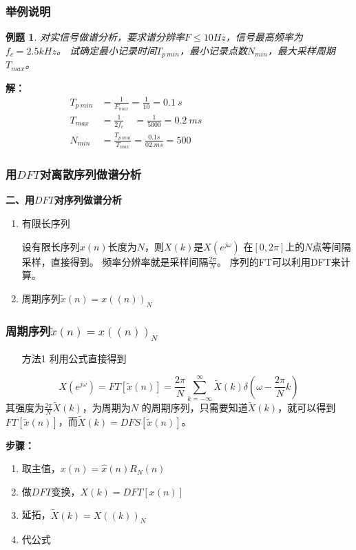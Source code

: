 \documentclass[notheorems,compress,mathserif,table]{beamer}
\newtheorem{example}{例题}
\begin{document}
\begin{frame}[shrink]\frametitle{举例说明}%
\begin{example}
对实信号做谱分析，要求谱分辨率$F\leq10Hz$，信号最高频率为$f_c = 2.5kHz$。
试确定最小记录时间$T_{p\: min}$，最小记录点数$N_{min}$，最大采样周期$T_{max}$。	
\end{example}
%
%
\textbf{解：}
\begin{equation*}
\begin{split}
    T_{p\:min} &= \frac{1}{F_{max}}   =  \frac{1}{10} =0.1\:s \quad\qquad\qquad\qquad\qquad\qquad   \\
    T_{max}    &= \frac{1}{2f_c} \quad     =  \frac{1}{5000} =0.2\:ms               \\
    N_{min}    &= \frac{T_{p\: min}}{T_{max}}  = \frac{0.1s}{02.ms}  = 500
\end{split}
\end{equation*}
\end{frame}


\begin{frame}[shrink]\frametitle{用$DFT$对离散序列做谱分析}%
\textbf{二、用$DFT$对序列做谱分析}
\begin{enumerate}
  \item 有限长序列\par
        \qquad 设有限长序列$x(n)$长度为$N$，则$X(k)$是$X(e^{j\omega})$ 在$[0,2\pi]$上的$N$点等间隔采样，直接得到。
        频率分辨率就是采样间隔$\frac{2\pi}{N} $。
        序列的FT可以利用DFT来计算。
  \item 周期序列$\tilde{x}(n) = x((n))_N$

\end{enumerate}
\end{frame}



\begin{frame}[shrink]\frametitle{周期序列$\tilde{x}(n) = x((n))_N$}%


  \begin{enumerate}
    \item [方法1]利用公式直接得到
  \end{enumerate}
      $$ X(e^{j\omega}) =FT[\tilde{x}(n)] = \frac{2\pi}{N}\sum_{k=-\infty}^{\infty}\tilde{X}(k)\delta(\omega-\frac{2\pi}{N}k)$$
      其强度为$\frac{2\pi}{N}\tilde{X}(k)$，为周期为$N$ 的周期序列，只需要知道$\tilde{X}(k)$，就可以得到$FT[\tilde{x}(n)]$，而$\tilde{X}(k) = DFS[\tilde{x}(n)]$。\par
      \quad \newline \quad
      \textbf{步骤：}
      \begin{enumerate}
        \item 取主值，$x(n) = \hat{x}(n)R_N(n)$
        \item 做$DFT$变换，$X(k) = DFT[x(n)]$
        \item 延拓，$\tilde{X}(k) = X((k))_N$
        \item 代公式
      \end{enumerate}
    
\end{frame}
\end{document}
